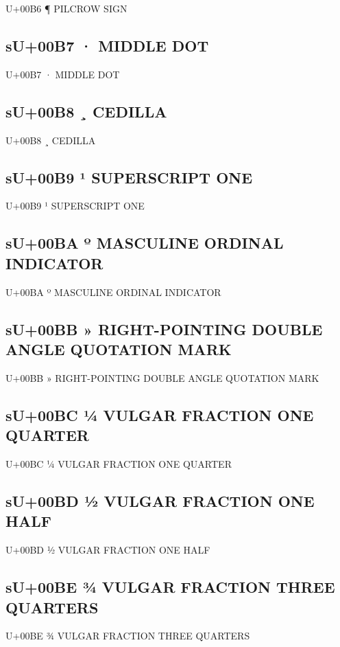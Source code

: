 U+00B6 ¶  PILCROW SIGN

\subsection{sU+00B7 ·  MIDDLE DOT}

U+00B7 ·  MIDDLE DOT

\subsection{sU+00B8 ¸  CEDILLA}

U+00B8 ¸  CEDILLA

\subsection{sU+00B9 ¹  SUPERSCRIPT ONE}

U+00B9 ¹  SUPERSCRIPT ONE

\subsection{sU+00BA º  MASCULINE ORDINAL INDICATOR}

U+00BA º  MASCULINE ORDINAL INDICATOR

\subsection{sU+00BB »  RIGHT-POINTING DOUBLE ANGLE QUOTATION MARK}

U+00BB »  RIGHT-POINTING DOUBLE ANGLE QUOTATION MARK

\subsection{sU+00BC ¼  VULGAR FRACTION ONE QUARTER}

U+00BC ¼  VULGAR FRACTION ONE QUARTER

\subsection{sU+00BD ½  VULGAR FRACTION ONE HALF}

U+00BD ½  VULGAR FRACTION ONE HALF

\subsection{sU+00BE ¾  VULGAR FRACTION THREE QUARTERS}

U+00BE ¾  VULGAR FRACTION THREE QUARTERS

